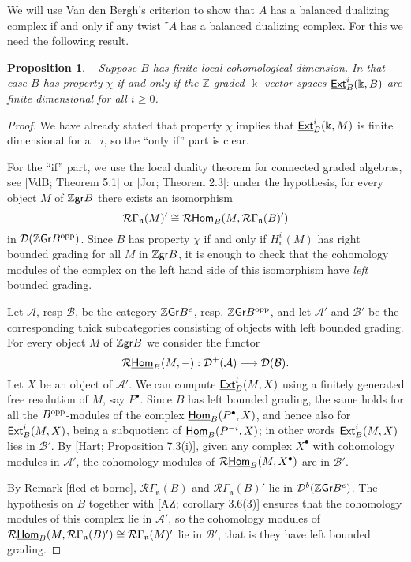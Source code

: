 \documentclass[twoside,11pt]{article}
\renewcommand{\k}{\Bbbk}
\newcommand{\Z}{{\mathbb Z}}
\newcommand{\A}{{\mathcal A}}
\newcommand{\B}{{\mathcal B}}
\newcommand{\D}{{\mathcal D}}
\newcommand{\R}{{\mathcal R}}
\newcommand{\n}{{\mathfrak n}}
\newcommand{\GrMod}{{\sf Gr}}
\newcommand{\grmod}{{\sf gr}}
\newcommand{\HOM}{\underline{{\sf Hom}}}
\newcommand{\EXT}{\underline{\sf Ext}}
\newcommand{\opp}{{\rm opp}}
\newtheorem{subproposition}[subtheorem]{Proposition}
\begin{document}
We will use Van den Bergh's criterion to show that $A$ has a balanced dualizing complex if
and only if any twist ${}^\tau A$ has a balanced dualizing complex. For this we need the
following result.
\begin{subproposition} -- \label{CNS-chi}
Suppose $B$ has finite local cohomological dimension. In that case $B$ has property $\chi$
if and only if the $\Z$-graded $\k$-vector spaces $\EXT_{B}^i(\k,B)$ are finite
dimensional for all $i \geq 0$.
\end{subproposition}
\begin{proof} 
We have already stated that property $\chi$ implies that $\EXT_B^i(\k,M)$ is finite
dimensional for all $i$, so the ``only if'' part is clear.

For the ``if'' part, we use the local duality theorem for connected graded algebras, see
[VdB; Theorem 5.1] or [Jor; Theorem 2.3]: under the hypothesis, for
every object $M$ of $\Z\grmod B$ there exists an isomorphism
\[
\R\Gamma_\n(M)' \cong \R\HOM_B(M, \R\Gamma_\n(B)')
\]
in $\D(\Z\GrMod B^\opp)$. Since $B$ has property $\chi$ if and only if $H^i_\n(M)$ has
right bounded grading for all $M$ in $\Z\grmod B$, it is enough to check that the
cohomology modules of the complex on the left hand side of this isomorphism have
\emph{left} bounded grading.

Let $\A$, resp $\B$, be the category $\Z\GrMod B^e$, resp. $\Z\GrMod B^\opp$, and let
$\A'$ and $\B'$ be the corresponding thick subcategories consisting of objects with
left bounded grading. For every object $M$ of $\Z\grmod B $ we consider the functor
\[
\R\HOM_B(M,-) : \D^+(\A) \longrightarrow \D(\B).  
\]
Let $X$ be an object of $\A'$. We can compute $\EXT^i_{B}(M,X)$ using a
finitely generated free resolution of $M$, say $P^\bullet$. Since $B$ has left bounded
grading, the same holds for all the $B^\opp$-modules of the complex $\HOM_B(P^\bullet,
X)$, and hence also for $\EXT^i_B(M, X)$, being a subquotient of $\HOM_B(P^{-i}, X)$; in
other words $\EXT^i_B(M, X)$ lies in $\B'$. By [Hart; Proposition 7.3(i)], given any
complex $X^\bullet$ with cohomology modules in $\A'$, the cohomology modules of
$\R\HOM_B(M, X^\bullet)$ are in $\B'$.

By Remark \ref{flcd-et-borne}, $\R\Gamma_\n(B)$ and $\R\Gamma_\n(B)'$ lie in
$\D^b(\Z\GrMod B^e)$. The hypothesis on $B$ together with [AZ;
corollary 3.6(3)] ensures that the cohomology modules of this complex lie in $\A'$, so the
cohomology modules of $\R\HOM_B(M, \R\Gamma_\n(B)') \cong \R \Gamma_\n(M)'$ lie in $\B'$,
that is they have left bounded grading.
\end{proof}
\end{document}
